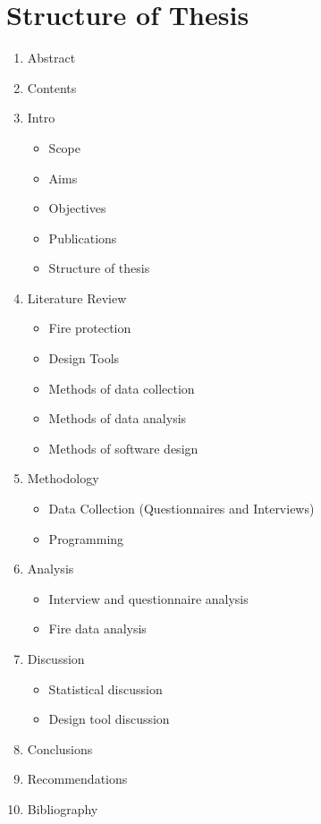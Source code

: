 \documentclass[table,a4paper,oneside]{book}
\begin{document}
\section{Structure of Thesis}
\label{sec:Structure}
\begin{enumerate}
\item Abstract
\item Contents
\item Intro
  \begin{itemize}
  \item Scope
  \item Aims
  \item Objectives
  \item Publications
  \item Structure of thesis
  \end{itemize}
\item Literature Review
  \begin{itemize}
  \item Fire protection
  \item Design Tools
  \item Methods of data collection
  \item Methods of data analysis
  \item Methods of software design
  \end{itemize}
\item Methodology
  \begin{itemize}
  \item Data Collection (Questionnaires and Interviews)
  \item Programming
  \end{itemize}
\item Analysis
  \begin{itemize}
  \item Interview and questionnaire analysis
  \item Fire data analysis
  \end{itemize}
\item Discussion
  \begin{itemize}
  \item Statistical discussion
  \item Design tool discussion
  \end{itemize}
\item Conclusions
\item Recommendations
\item Bibliography
\end{enumerate}




\end{document}
